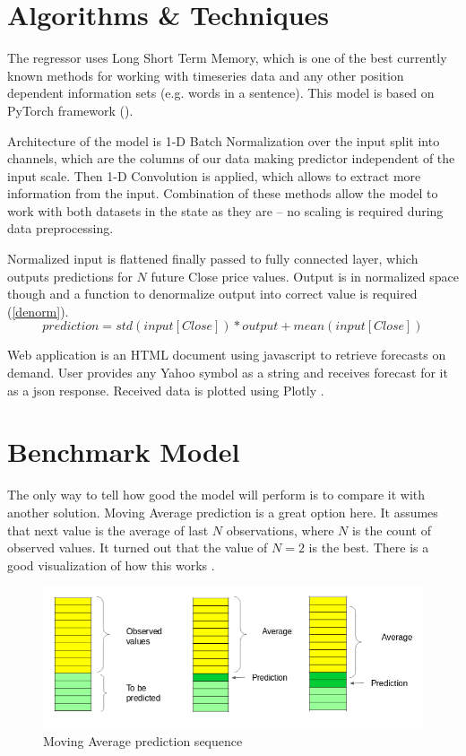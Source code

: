 \documentclass[a4paper,12pt]{article}
\begin{document}
\section{Algorithms \& Techniques}
The regressor uses Long Short Term Memory, which is one of the best currently known methods for working with timeseries data and any other position dependent information sets (e.g. words in a sentence). This model is based on PyTorch framework (\cite{Torch}).

Architecture of the model is 1-D Batch Normalization over the input split into channels, which are the columns of our data making predictor independent of the input scale. Then 1-D Convolution is applied, which allows to extract more information from the input. Combination of these methods allow the model to work with both datasets in the state as they are -- no scaling is required during data preprocessing.

Normalized input is flattened finally passed to fully connected layer, which outputs predictions for $N$ future Close price values. Output is in normalized space though and a function to denormalize output into correct value is required (\ref{denorm}).
\begin{equation}
\label{denorm}
prediction = std(input[Close]) * output + mean(input[Close])
\end{equation}

Web application is an HTML document using javascript to retrieve forecasts on demand. User provides any Yahoo symbol as a string and receives forecast for it as a json response. Received data is plotted using Plotly \cite{Plotly}.

\section{Benchmark Model}
The only way to tell how good the model will perform is to compare it with another solution. Moving Average prediction is a great option here. It assumes that next value is the average of last $N$ observations, where $N$ is the count of observed values. It turned out that the value of $N = 2$ is the best. There is a good visualization of how this works \cite{Vidhya}.
\begin{figure}[h]
	\centering
	\includegraphics[scale=0.5]{ma}
	\caption{Moving Average prediction sequence \cite{Vidhya}}
\end{figure}
\end{document}
